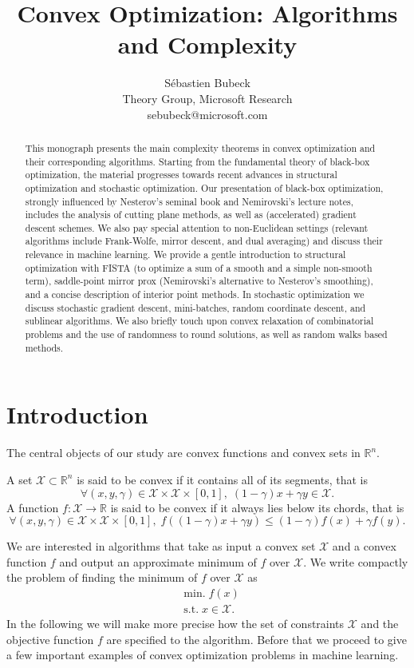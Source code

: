 \documentclass[openany]{now}
\title{Convex Optimization: Algorithms and Complexity}
\author{S\'ebastien Bubeck \\
Theory Group, Microsoft Research \\
sebubeck@microsoft.com}
\newcommand{\R}{\mathbb{R}}
\newcommand{\cX}{\mathcal{X}}
\begin{document}
\frontmatter

\maketitle

\tableofcontents

\mainmatter

\begin{abstract}
This monograph presents the main complexity theorems in convex optimization and their corresponding algorithms.
Starting from the fundamental theory of black-box optimization, the material progresses towards recent advances in structural optimization and stochastic optimization. Our presentation of black-box optimization, strongly influenced by Nesterov's seminal book and Nemirovski's lecture notes, includes the analysis of cutting plane methods, as well as (accelerated) gradient descent schemes. We also pay special attention to non-Euclidean settings (relevant algorithms include Frank-Wolfe, mirror descent, and dual averaging) and discuss their relevance in machine learning. We provide a gentle introduction to structural optimization with FISTA (to optimize a sum of a smooth and a simple non-smooth term), saddle-point mirror prox (Nemirovski's alternative to Nesterov's smoothing), and a concise description of interior point methods. In stochastic optimization we discuss stochastic gradient descent, mini-batches, random coordinate descent, and sublinear algorithms. We also briefly touch upon convex relaxation of combinatorial problems and the use of randomness to round solutions, as well as random walks based methods.
\end{abstract}

\chapter{Introduction}
\label{intro}
The central objects of our study are convex functions and convex sets in $\R^n$.

\begin{definition}
A set $\cX \subset \R^n$ is said to be convex if it contains all of its segments, that is
$$\forall (x,y,\gamma) \in \cX \times \cX \times [0,1], \; (1-\gamma) x + \gamma y \in \mathcal{X}.$$
A function $f : \mathcal{X} \rightarrow \R$ is said to be convex if it always lies below its chords, that is
$$ \forall (x,y,\gamma) \in \cX \times \cX \times [0,1], \; f((1-\gamma) x + \gamma y) \leq (1-\gamma)f(x) + \gamma f(y) .$$
\end{definition}
We are interested in algorithms that take as input a convex set $\cX$ and a convex function $f$ and output an approximate minimum of $f$ over $\cX$. We write compactly the problem of finding the minimum of $f$ over $\cX$ as
\begin{align*}
& \mathrm{min.} \; f(x) \\
& \text{s.t.} \; x \in \cX .
\end{align*}
In the following we will make more precise how the set of constraints $\cX$ and the objective function $f$ are specified to the algorithm. Before that we proceed to give a few important examples of convex optimization problems in machine learning.
\end{document}
